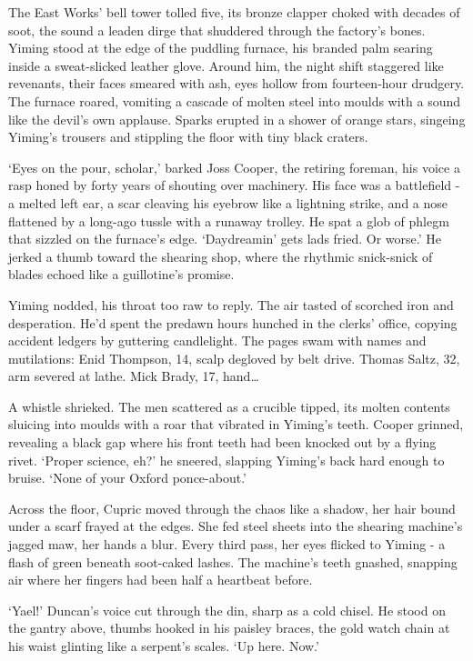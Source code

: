 The East Works' bell tower tolled five, its bronze clapper choked with decades of soot, the sound a leaden dirge that shuddered through the factory's bones. Yiming stood at the edge of the puddling furnace, his branded palm searing inside a sweat-slicked leather glove. Around him, the night shift staggered like revenants, their faces smeared with ash, eyes hollow from fourteen-hour drudgery. The furnace roared, vomiting a cascade of molten steel into moulds with a sound like the devil's own applause. Sparks erupted in a shower of orange stars, singeing Yiming's trousers and stippling the floor with tiny black craters.

`Eyes on the pour, scholar,' barked Joss Cooper, the retiring foreman, his voice a rasp honed by forty years of shouting over machinery. His face was a battlefield - a melted left ear, a scar cleaving his eyebrow like a lightning strike, and a nose flattened by a long-ago tussle with a runaway trolley. He spat a glob of phlegm that sizzled on the furnace's edge. `Daydreamin' gets lads fried. Or worse.' He jerked a thumb toward the shearing shop, where the rhythmic snick-snick of blades echoed like a guillotine's promise.

Yiming nodded, his throat too raw to reply. The air tasted of scorched iron and desperation. He'd spent the predawn hours hunched in the clerks' office, copying accident ledgers by guttering candlelight. The pages swam with names and mutilations: Enid Thompson, 14, scalp degloved by belt drive. Thomas Saltz, 32, arm severed at lathe. Mick Brady, 17, hand\dots

A whistle shrieked. The men scattered as a crucible tipped, its molten contents sluicing into moulds with a roar that vibrated in Yiming's teeth. Cooper grinned, revealing a black gap where his front teeth had been knocked out by a flying rivet. `Proper science, eh?' he sneered, slapping Yiming's back hard enough to bruise. `None of your Oxford ponce-about.'

Across the floor, Cupric moved through the chaos like a shadow, her hair bound under a scarf frayed at the edges. She fed steel sheets into the shearing machine's jagged maw, her hands a blur. Every third pass, her eyes flicked to Yiming - a flash of green beneath soot-caked lashes. The machine's teeth gnashed, snapping air where her fingers had been half a heartbeat before.

`Yael!' Duncan's voice cut through the din, sharp as a cold chisel. He stood on the gantry above, thumbs hooked in his paisley braces, the gold watch chain at his waist glinting like a serpent's scales. `Up here. Now.'

